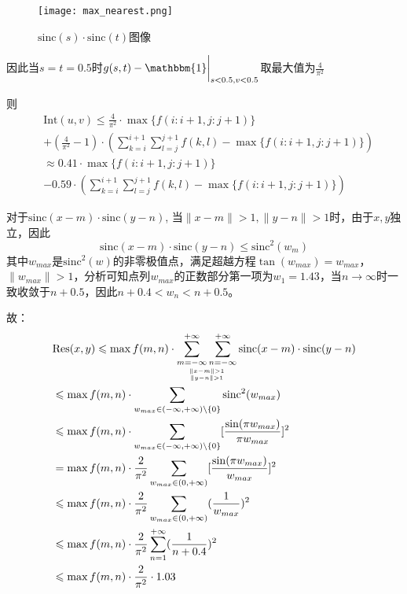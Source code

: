 \documentclass{article}
\begin{document}
\begin{figure}[H]
    \centering
    \texttt{[image: max\_nearest.png]}
    \caption{$\mathrm{sinc}(s)\cdot \mathrm{sinc}(t)$图像}
    \label{fig:3.1}
\end{figure}

因此当$s = t = 0.5$时$g(s,t)-\mathbbm{1}\bigg|_{s < 0.5, v < 0.5}$取最大值为$\frac{4}{\pi^2}$

则
\begin{equation}
	\begin{aligned}
		& \mathrm{Int}(u,v) \leqslant \frac{4}{\pi^2} \cdot \max\{f(i:i+1, j:j+1)\} \\
		& + (\frac{4}{\pi^2} - 1)\cdot(\sum_{k=i}^{i+1}\sum_{l=j}^{j+1} f(k,l)- \max\{f(i:i+1, j:j+1)\})\\
		& \approx 0.41 \cdot \max\{f(i:i+1, j:j+1)\} \\
		& - 0.59 \cdot(\sum_{k=i}^{i+1}\sum_{l=j}^{j+1} f(k,l)- \max\{f(i:i+1, j:j+1)\})
	\end{aligned}
\end{equation}

对于$\mathrm{sinc}(x-m)\cdot \mathrm{sinc}(y-n)$, 当$\|x-m\|>1, \|y-n\|>1$时，由于$x,y$独立，因此
$$\mathrm{sinc}(x-m)\cdot \mathrm{sinc}(y-n)\leqslant\mathrm{sinc^2}(w_m)$$
其中$w_{max}$是$\mathrm{sinc^2}(w)$的非零极值点，满足超越方程$\tan(w_{max}) = w_{max}$，$ \| w_{max} \| > 1 $，分析可知点列$w_{max}$的正数部分第一项为$w_1 = 1.43$，当$n\rightarrow \infty$时一致收敛于$n + 0.5$，因此$n + 0.4 < w_n < n + 0.5$。

故：
\begin{equation}
	\begin{aligned}
		& \mathrm{Res}(x,y) \leqslant \max{f(m,n)}\cdot\mathop{\sum_{m=-\infty}^{+\infty}\sum_{n=-\infty}^{+\infty}}_{\|x-m\|>1 \atop \|y-n\|>1} \mathrm{sinc}(x-m)\cdot \mathrm{sinc}(y-n) \\ 
		& \leqslant \max{f(m,n)}\cdot \sum_{w_{max}\in(-\infty,+\infty)\backslash\{0\}}\mathrm{sinc^2}(w_{max}) \\
		& \leqslant \max{f(m,n)}\cdot \sum_{w_{max}\in(-\infty,+\infty)\backslash\{0\}}[\frac{\sin(\pi w_{max})}{\pi w_{max}}]^2\nonumber\\
		& = \max{f(m,n)}\cdot \frac{2}{\pi^2}\sum_{w_{max}\in(0,+\infty)}[\frac{\sin(\pi w_{max})}{w_{max}}]^2\\
		& \leqslant \max{f(m,n)}\cdot \frac{2}{\pi^2}\sum_{w_{max}\in(0,+\infty)}(\frac{1}{w_{max}})^2\\
		& \leqslant \max{f(m,n)}\cdot \frac{2}{\pi^2}\sum_{n = 1}^{+\infty}(\frac{1}{n+0.4})^2\\
		& \leqslant \max{f(m,n)}\cdot \frac{2}{\pi^2}\cdot 1.03
	\end{aligned}
\end{equation}
\end{document}
